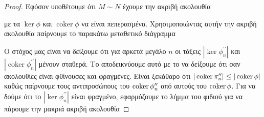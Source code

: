 \begin{proof} Εφόσον υποθέτουμε ότι $M\sim N$ έχουμε την ακριβή ακολουθία
    \begin{figure}[H]
        \centering
    \end{figure} 
    \noindent με τα $\ker\phi$ και $\operatorname{coker}\phi$ να είναι πεπερασμένα. Χρησιμοποιώντας αυτήν την ακριβή ακολουθία παίρνουμε το παρακάτω μεταθετικό διάγραμμα


    \begin{figure}[H]
        \centering
    \end{figure}

\noindent Ο στόχος μας είναι να δείξουμε ότι για αρκετά μεγάλο $n$ οι τάξεις $|\ker \phi^{\prime\prime}_n|$ και $|\operatorname{coker}\phi^{\prime\prime}_n|$ μένουν σταθερά. Το αποδεικνύουμε αυτό με το να δείξουμε ότι σαν ακολουθίες είναι φθίνουσες και φραγμένες. Είναι ξεκάθαρο ότι $|\operatorname{coker}\pi^{\prime\prime}_n|\leq |\operatorname{coker} \phi|$
καθώς παίρνουμε τους αντιπροσώπους του $\operatorname{coker}\phi^{\prime\prime}_n$ από αυτούς του $\operatorname{coker}\phi$. Για να δούμε ότι το $|\ker\phi^{\prime\prime}_n|$ είναι φραγμένο, εφαρμόζουμε το λήμμα του φιδιού για να πάρουμε την μακριά ακριβή ακολουθία


\end{proof}
